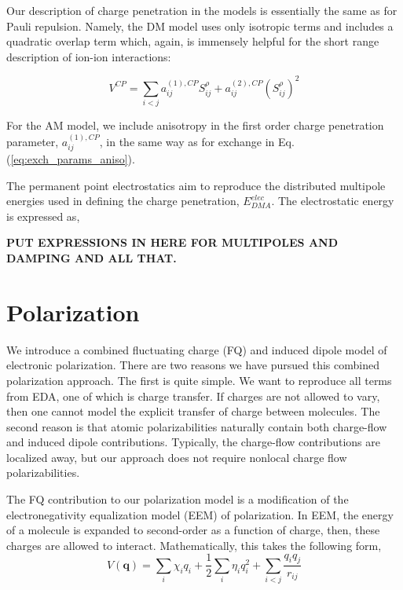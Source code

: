 \documentclass[journal=jacsat,manuscript=article]{achemso}
\begin{document}
Our description of charge penetration in the models is essentially
the same as for Pauli repulsion. Namely, the DM model uses only
isotropic terms and includes a quadratic overlap term which, again,
is immensely helpful for the short range description of ion-ion interactions:

\begin{equation}
  V^{CP} = \sum_{i<j}a_{ij}^{(1),CP}S_{ij}^\rho+a_{ij}^{(2),CP}(S_{ij}^\rho)^2
  \label{eq:exch_iso}
\end{equation}

For the AM model, we include anisotropy in the first order charge penetration
parameter, $a_{ij}^{(1),CP}$, in the same way as for exchange in Eq. (\ref{eq:exch_params_aniso}).

The permanent point electrostatics aim to reproduce the distributed
multipole energies used in defining the charge penetration, $E^{elec}_{DMA}$.
The electrostatic energy is expressed as,

\textbf{PUT EXPRESSIONS IN HERE FOR MULTIPOLES AND DAMPING AND ALL THAT.}

\section*{Polarization}

We introduce a combined fluctuating charge (FQ) and induced dipole model of electronic
polarization. There are two reasons we have pursued this combined polarization
approach. The first is quite simple. We want to reproduce all terms from EDA,
one of which is charge transfer. If charges are not allowed to vary, then one
cannot model the explicit transfer of charge between molecules. The second reason is
that atomic polarizabilities naturally contain both charge-flow and induced dipole
contributions.\cite{stone1985distributedb} Typically, the charge-flow contributions
are localized away\cite{ruth1994localization}, but our approach does not require nonlocal
charge flow polarizabilities.

The FQ contribution to our polarization model is a modification of the electronegativity
equalization model (EEM) of polarization.\cite{mortier1986electronegativity} In EEM,
the energy of a molecule is expanded to second-order as a function of charge, then,
these charges are allowed to interact. Mathematically, this takes the following form,
\begin{equation}
  V(\bm{q})=\sum_i \chi_i q_i + \frac12 \sum_i \eta_i q_i^2 + \sum_{i<j} \frac{q_i q_j}{r_{ij}}
  \label{eq:eem}
\end{equation}
\end{document}
